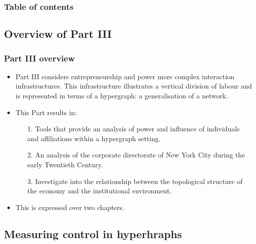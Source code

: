 \documentclass[10pt]{beamer}
\begin{document}
\begin{frame}
\frametitle{Table of contents}
\tableofcontents[currentsection]
\end{frame}

\subsection{Overview of Part III}

\begin{frame} \frametitle{Part III overview}
\begin{itemize}
\item Part III considers entrepreneurship and power more complex interaction infrastructures. This infrastructure illustrates a vertical division of labour and is represented in terms of a hypergraph: a generalisation of a network.
\medskip
\item This Part results in:
\begin{itemize}
\medskip
\item[1.] Tools that provide an analysis of power and influence of individuals and affiliations within a hypergraph setting.
\medskip
\item[2.] An analysis of the corporate directorate of New York City during the early Twentieth Century.
\medskip
\item[3.] Investigate into the relationship between the topological structure of the economy and the institutional environment.
\end{itemize}
\medskip
\item This is expressed over two chapters.
\end{itemize}
\end{frame}

\subsection{Measuring control in hyperhraphs}
\end{document}
